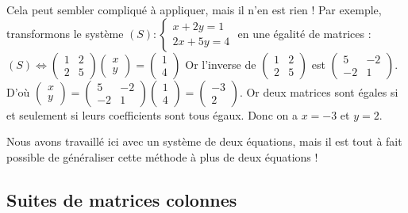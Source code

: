 	\begin{tip}[Exemple]
		Cela peut sembler compliqué à appliquer, mais il n'en est rien !
		\newpar
		Par exemple, transformons le système $\displaystyle{(S) : \begin{cases}x + 2y = 1 \\ 2x + 5y = 4 \end{cases}}$ en une égalité de matrices :
		\newpar
		$\displaystyle{(S) \iff \begin{pmatrix}1 & 2 \\ 2 & 5\end{pmatrix} \begin{pmatrix}x \\ y\end{pmatrix} = \begin{pmatrix}1 \\ 4 \end{pmatrix}}$
		\newpar
		Or l'inverse de $\displaystyle{\begin{pmatrix}1 & 2 \\ 2 & 5\end{pmatrix}}$ est $\displaystyle{\begin{pmatrix}5 & -2 \\ -2 & 1\end{pmatrix}}$. D'où $\displaystyle{\begin{pmatrix}x \\ y\end{pmatrix} = \begin{pmatrix}5 & -2 \\ -2 & 1\end{pmatrix} \begin{pmatrix}1 \\ 4\end{pmatrix} = \begin{pmatrix}-3 \\ 2\end{pmatrix}}$.
		\newpar
		Or deux matrices sont égales si et seulement si leurs coefficients sont tous égaux. Donc on a $x = -3$ et $y = 2$.
	\end{tip}

	Nous avons travaillé ici avec un système de deux équations, mais il est tout à fait possible de généraliser cette méthode à plus de deux équations !

	\subsection{Suites de matrices colonnes}

